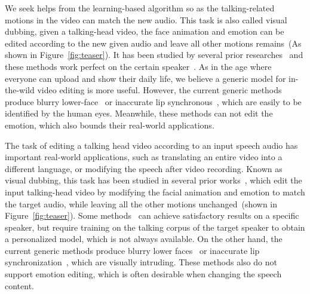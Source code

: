 We seek helps from the learning-based algorithm so as the talking-related motions in the video can match the new audio. This task is also called visual dubbing, given a talking-head video, the face animation and emotion can be edited according to the new given audio and leave all other motions remains~(As shown in Figure~\ref{fig:teaser}). It has been studied by several prior researches~\cite{obama,AudioDVP,NVP} and these methods work perfect on the certain speaker~\cite{obama,AudioDVP,NVP}.
As in the age where everyone can upload and show their daily life, we believe a generic model for in-the-wild video editing is more useful. 
However, the current generic methods produce blurry lower-face~\cite{wav2lip} or inaccurate lip synchronous~\cite{song2022everybody}, which are easily to be identified by the human eyes. Meanwhile, these methods can not edit the emotion, which also bounds their real-world applications.
\fi

The task of editing a talking head video according to an input speech audio has important real-world applications, such as translating an entire video into a different language, or modifying the speech after video recording. Known as visual dubbing, this task has been studied in several prior works~\cite{obama,AudioDVP,NVP,wav2lip}, which edit the input talking-head video by modifying the facial animation and emotion to match the target audio, while leaving all the other motions unchanged~(shown in Figure~\ref{fig:teaser}).
Some methods~\cite{obama,AudioDVP,NVP} can achieve satisfactory results on a specific speaker, but require training on the talking corpus of the target speaker to obtain a personalized model, which is not always available. %
On the other hand, the current generic methods produce blurry lower faces~\cite{wav2lip} or inaccurate lip synchronization~\cite{song2022everybody}, 
which are visually intruding. These methods also do not support emotion editing, which is often desirable when changing the speech content.




